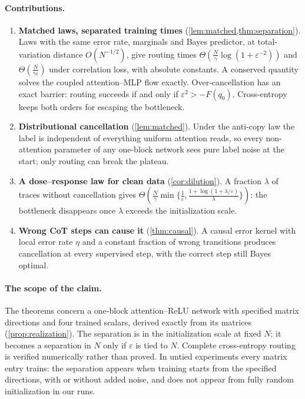 \paragraph{Contributions.}
\begin{enumerate}[leftmargin=*,itemsep=2pt,topsep=2pt]
\item \textbf{Matched laws, separated training times} (\cref{lem:matched,thm:separation}). Laws with the same error rate, marginals and Bayes predictor,
at total-variation distance $O(N^{-1/2})$, give routing times $\Theta(\tfrac{N}{\gamma}\log(1+\varepsilon^{-2}))$ and $\Theta(\tfrac{N}{\gamma\varepsilon})$ under correlation loss,
with absolute constants. A conserved quantity solves the coupled attention--MLP flow exactly. Over-cancellation has an exact barrier: routing succeeds if and only if
$\varepsilon^2>-F(q_0)$. Cross-entropy keeps both orders for escaping the bottleneck.
\item \textbf{Distributional cancellation} (\cref{lem:matched}). Under the anti-copy law the label is independent of everything uniform attention reads,
so every non-attention parameter of any one-block network sees pure label noise at the start; only routing can break the plateau.
\item \textbf{A dose--response law for clean data} (\cref{cor:dilution}). A fraction $\lambda$ of traces without cancellation gives
$\Theta(\tfrac{N}{\gamma}\min\{\tfrac{1}{\varepsilon},\tfrac{1+\log(1+\lambda/\varepsilon)}{\lambda}\})$: the bottleneck disappears once $\lambda$ exceeds the initialization scale.
\item \textbf{Wrong CoT steps can cause it} (\cref{thm:causal}). A causal error kernel with local error rate $\eta$ and a constant fraction of wrong transitions
produces cancellation at every supervised step, with the correct step still Bayes optimal.
\end{enumerate}

\paragraph{The scope of the claim.} The theorems concern a one-block attention--ReLU network with specified matrix directions and four trained scalars,
derived exactly from its matrices (\cref{prop:realization}). The separation is in the initialization scale at fixed $N$; it becomes a separation in $N$ only if
$\varepsilon$ is tied to $N$. Complete cross-entropy routing is verified numerically rather than proved. In untied experiments every matrix entry trains:
the separation appears when training starts from the specified directions, with or without added noise, and does not appear from fully random initialization in our runs.
